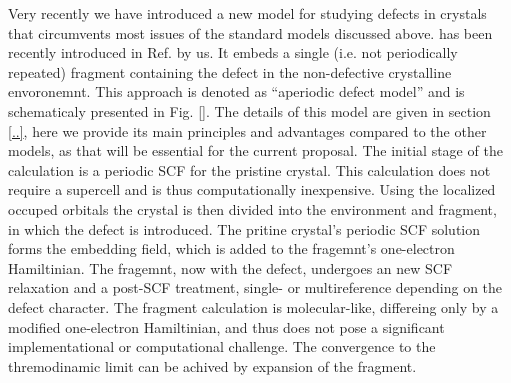 \documentclass[a4paper,11pt,headings=normal]{scrartcl}
\begin{document}
Very recently we have introduced\cite{..} a new model for studying defects in crystals that circumvents most issues of the standard models discussed above. has been recently introduced in Ref. \cite{..} by us.  It embeds a single (i.e. not periodically repeated) fragment containing the defect in the non-defective crystalline envoronemnt. This approach is denoted as ``aperiodic defect model'' and is schematicaly presented in Fig. \ref{}. The details of this model are given in section \ref{..}, here we provide its main principles and advantages compared to the other models, as that will be essential for the current proposal. The initial stage of the calculation is a periodic SCF for the pristine crystal. This calculation does not require a supercell and is thus computationally inexpensive. Using the localized occuped orbitals the crystal is then divided into the environment and fragment, in which the defect is introduced. The pritine crystal's periodic SCF solution forms the embedding field, which is added to the fragemnt's one-electron Hamiltinian. The fragemnt, now with the defect, undergoes an new SCF relaxation and a post-SCF treatment, single- or multireference depending on the defect character. The fragment calculation is molecular-like, differeing only by a modified one-electron Hamiltinian, and thus does not pose a significant implementational or computational challenge. The convergence to the thremodinamic limit can be achived by expansion of the fragment.   
\end{document}
